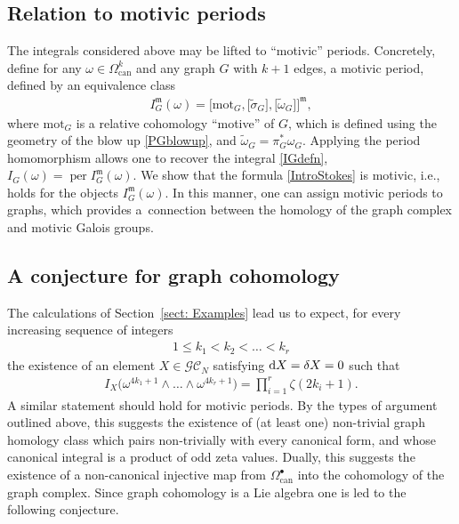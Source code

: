 \documentclass[pdftex]{sigma}%
\numberwithin{equation}{section}
\newcommand{\GC}{\mathcal{GC}}
\newcommand{\can}{\mathrm{can}}
\newcommand{\mm}{\mathfrak{m}}
\newcommand{\0}{\color{blue}{\mathsf{0}}}
\begin{document}
\subsection{Relation to motivic periods}
The integrals considered above may be lifted to ``motivic'' periods.
Concretely, define for any $\omega \in \Omega^{k}_{\can}$ and any graph $G$ with $k+1$ edges, a motivic period, defined by an equivalence class
\begin{gather*}
I^{\mm}_G(\omega) = \big[ \mathrm{mot}_G, \big[\widetilde{\sigma}_G\big], \big[\widetilde{\omega}_G\big]\big]^{\mm},
\end{gather*}
where $\mathrm{mot}_G$ is a relative cohomology ``motive'' of $G$, which is defined using the geometry of the blow up \eqref{PGblowup}, and $\widetilde{\omega}_G = \pi_G^* \omega_G$. Applying the period homomorphism allows one to recover the integral \eqref{IGdefn}, $I_G(\omega)= \operatorname{per} I^{\mm}_G(\omega)$.
We show that the formula \eqref{IntroStokes} is motivic, i.e., holds for the objects $I_G^{\mm}(\omega)$. In this manner, one can assign motivic periods to graphs, which provides a~connection between the homology of the graph complex and motivic Galois groups.

\subsection{A conjecture for graph cohomology}
The calculations of Section~\ref{sect: Examples} lead us to expect, for every increasing sequence of integers
\begin{gather*}
1\leq k_1< k_2 < \dots < k_r
\end{gather*}
 the existence of an element $X \in \GC_N$ satisfying ${\rm d}X=\delta X= 0 $ such that
\begin{gather*}
I_X\big(\omega^{4k_1+1} \wedge \dots \wedge \omega^{4k_r+1} \big) = \prod_{i=1}^r \zeta(2k_i+1) .
\end{gather*}
A similar statement should hold for motivic periods.
By the types of argument outlined above, this suggests the existence of (at least one) non-trivial graph homology class which pairs non-trivially with every canonical form, and whose canonical integral is a product of odd zeta values.
Dually, this suggests the existence of a non-canonical injective map from $\Omega^{\bullet}_{\can}$ into the cohomology of the graph complex.
Since graph cohomology is a Lie algebra one is led to the following conjecture.
\end{document}
